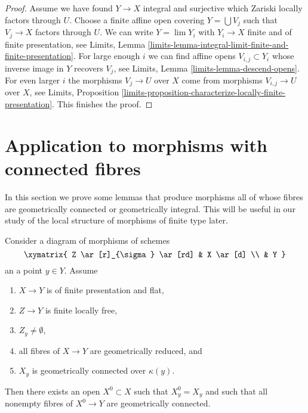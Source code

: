 \begin{proof}
\medskip\noindent
Assume we have found $Y \to X$ integral and surjective which Zariski
locally factors through $U$. Choose a finite affine open covering
$Y = \bigcup V_j$ such that $V_j \to X$ factors through $U$. We can
write $Y = \lim Y_i$ with $Y_i \to X$ finite and of finite
presentation, see Limits, Lemma
\ref{limits-lemma-integral-limit-finite-and-finite-presentation}.
For large enough $i$ we can find affine opens $V_{i, j} \subset Y_i$
whose inverse image in $Y$ recovers $V_j$, see
Limits, Lemma \ref{limits-lemma-descend-opens}.
For even larger $i$ the morphisms $V_j \to U$ over $X$ come
from morphisms $V_{i, j} \to U$ over $X$, see
Limits, Proposition
\ref{limits-proposition-characterize-locally-finite-presentation}.
This finishes the proof.
\end{proof}







\section{Application to morphisms with connected fibres}
\label{section-application-geometrically-connected}

\noindent
In this section we prove some lemmas that produce morphisms all of
whose fibres are geometrically connected or geometrically integral.
This will be useful in our study of the local structure of morphisms
of finite type later.

\begin{lemma}
\label{lemma-descent-connected-fibres}
Consider a diagram of morphisms of schemes
$$
\xymatrix{
Z \ar[r]_{\sigma} \ar[rd] & X \ar[d] \\
& Y
}
$$
an a point $y \in Y$. Assume
\begin{enumerate}
\item $X \to Y$ is of finite presentation and flat,
\item $Z \to Y$ is finite locally free,
\item $Z_y \not = \emptyset$,
\item all fibres of $X \to Y$ are geometrically reduced, and
\item $X_y$ is geometrically connected over $\kappa(y)$.
\end{enumerate}
Then there exists an open $X^0 \subset X$ such that $X^0_y = X_y$
and such that all nonempty fibres of $X^0 \to Y$ are geometrically connected.
\end{lemma}

